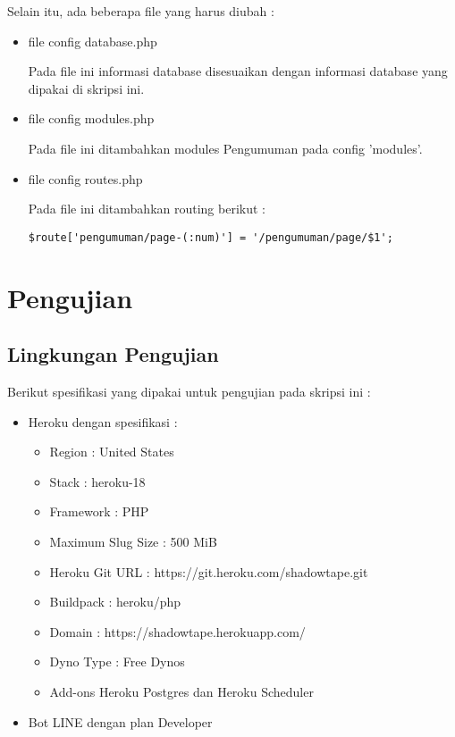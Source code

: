 Selain itu, ada beberapa file yang harus diubah :
\begin{itemize}
\item file config database.php

Pada file ini informasi database disesuaikan dengan informasi database yang dipakai di skripsi ini.

\item file config modules.php

Pada file ini ditambahkan modules Pengumuman pada config 'modules'.

\item file config routes.php

Pada file ini ditambahkan routing berikut :
\begin{lstlisting}
$route['pengumuman/page-(:num)'] = '/pengumuman/page/$1';
\end{lstlisting}
\end{itemize}

\section{Pengujian}
\subsection{Lingkungan Pengujian}
Berikut spesifikasi yang dipakai untuk pengujian pada skripsi ini :
\begin{itemize}
\item Heroku dengan spesifikasi :

\begin{itemize}
\item Region : United States
\item Stack : heroku-18
\item Framework : PHP
\item Maximum Slug Size : 500 MiB
\item Heroku Git URL : https://git.heroku.com/shadowtape.git
\item Buildpack : heroku/php
\item Domain : https://shadowtape.herokuapp.com/
\item Dyno Type : Free Dynos
\item Add-ons Heroku Postgres dan Heroku Scheduler
\end{itemize}

\item Bot LINE dengan plan Developer
\end{itemize}

